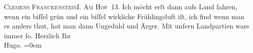 \begin{ledgroupsized}[t]{13cm}
           \pstart
           \textsc{Clemens Franckenstein}\textsc{I. Am Hof} 13. Ich möcht erſt dann aufs Land
                    fahren, wenn ein biſſel grün und ein biſſel wirkliche Frühlingsluft iſt, ich
                    find wenn {\pb}man es anders
                    thut, hat man dann Ungeduld und Ärger. Mit unſern Landpartien wars immer ſo.\pend
           \pstart
           Herzlich Ihr{\\[\baselineskip]}\spacefill\mbox{Hugo.}\pend
           \leftskip=0em{}\endnumbering{}\end{ledgroupsized}  \newcommand{\dateiname}{L00786}\newcommand{\titel}{Hugo von Hofmannsthal an Arthur Schnitzler, [23. 3. 1898]}\newcommand{\editorInnen}{Martin Anton Müller und Gerd-Hermann Susen}
      